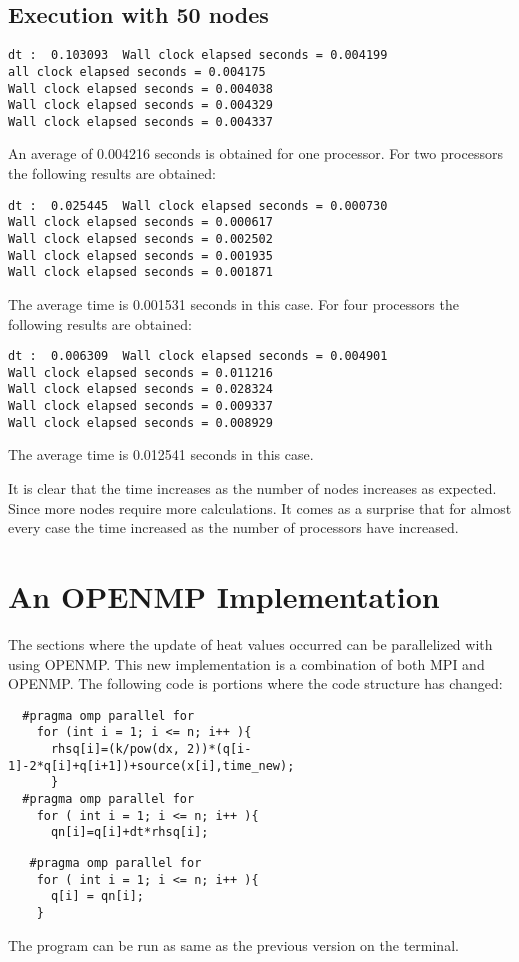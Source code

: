 \documentclass{article}
\begin{document}
\subsection{Execution with 50 nodes}
\begin{verbatim}
dt :  0.103093  Wall clock elapsed seconds = 0.004199
all clock elapsed seconds = 0.004175
Wall clock elapsed seconds = 0.004038
Wall clock elapsed seconds = 0.004329
Wall clock elapsed seconds = 0.004337
\end{verbatim}
An average of 0.004216 seconds is obtained for one processor.
For two processors the following results are obtained:
\begin{verbatim}
dt :  0.025445  Wall clock elapsed seconds = 0.000730
Wall clock elapsed seconds = 0.000617
Wall clock elapsed seconds = 0.002502
Wall clock elapsed seconds = 0.001935
Wall clock elapsed seconds = 0.001871
\end{verbatim}
The average time is 0.001531 seconds in this case. 
For four processors the following results are obtained:
\begin{verbatim}
dt :  0.006309  Wall clock elapsed seconds = 0.004901
Wall clock elapsed seconds = 0.011216
Wall clock elapsed seconds = 0.028324
Wall clock elapsed seconds = 0.009337
Wall clock elapsed seconds = 0.008929
\end{verbatim}
The average time is 0.012541 seconds in this case.

It is clear that the time increases as the number of nodes increases as expected. Since more nodes require more calculations. It comes as a surprise that for almost every case the time increased as the number of processors have increased.

\section{An OPENMP Implementation}
The sections where the update of heat values occurred can be parallelized with using OPENMP. This new implementation is a combination of both MPI and OPENMP. The following code is portions where the code structure has changed:
\begin{verbatim}
  #pragma omp parallel for
    for (int i = 1; i <= n; i++ ){
      rhsq[i]=(k/pow(dx, 2))*(q[i-1]-2*q[i]+q[i+1])+source(x[i],time_new);
      }
  #pragma omp parallel for
    for ( int i = 1; i <= n; i++ ){
      qn[i]=q[i]+dt*rhsq[i];
\end{verbatim}
\begin{verbatim}
   #pragma omp parallel for
    for ( int i = 1; i <= n; i++ ){
      q[i] = qn[i];
    }
\end{verbatim}
The program can be run as same as the previous version on the terminal.
\end{document}
